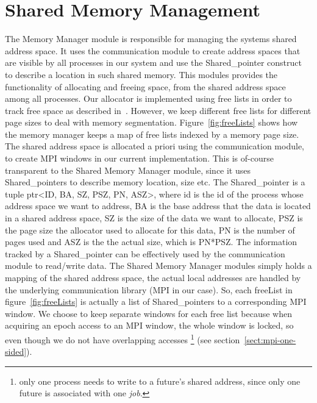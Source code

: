 \section{Shared Memory Management}
\label{sect:shared-memory-manager}
The Memory Manager module is responsible for managing the systems shared address space. 
It uses the communication module to create address spaces that
are visible by all processes in our system and use the Shared\_pointer construct to describe a location in such
shared memory.  This modules provides the functionality of allocating and freeing space, from the shared address 
space among all processes.  Our allocator is implemented using free lists in order to track free space as 
described in~\cite[p.~185-187]{Tanenbaum:2007:MOS:1410217}.  
However, we keep different free lists for different page sizes to deal
with memory segmentation. Figure~\ref{fig:freeLists} shows how the memory manager keeps a map of free lists
indexed by a memory page size.
The shared address space is allocated a priori
using the communication module, to create MPI windows in our current implementation.  This is of-course transparent to
the Shared Memory Manager module, since it uses Shared\_pointers to describe memory location, size etc.  
The Shared\_pointer is a tuple  ptr<ID, BA, SZ, PSZ, PN, ASZ>, where id is the id of the process
whose address space we want to address, BA is the base address that the data is located in a shared address space,
SZ is the size of the data we want to allocate, PSZ is the page size the allocator used to allocate for this data,
PN is the number of pages used and ASZ is the the actual size, which is PN*PSZ.  The information tracked by a 
Shared\_pointer can be effectively used by the communication module to read/write data.  The Shared Memory Manager
modules simply holds a mapping of the shared address space, the actual local addresses are handled by the 
underlying communication library (MPI in our case).   
So, each freeList in figure~\ref{fig:freeLists} is actually a list of 
Shared\_pointers to a corresponding MPI window.  We choose
to keep separate windows for each free list because when acquiring an epoch access to an MPI window, the whole 
window is locked, so even though we do not have overlapping accesses \footnote{only one process needs to write to a 
future's shared address, since only one future is associated with one \emph{job}.} 
(see section~\ref{sect:mpi-one-sided}).  

